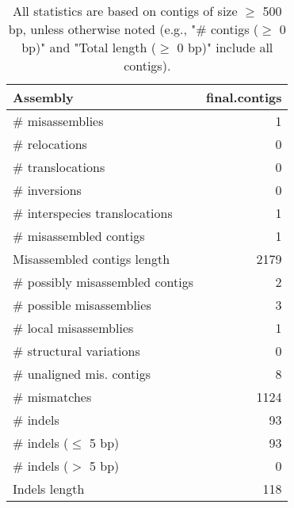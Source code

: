\documentclass[12pt,a4paper]{article}
\begin{document}
\begin{table}[ht]
\begin{center}
\caption{All statistics are based on contigs of size $\geq$ 500 bp, unless otherwise noted (e.g., "\# contigs ($\geq$ 0 bp)" and "Total length ($\geq$ 0 bp)" include all contigs).}
\begin{tabular}{|l*{1}{|r}|}
\hline
Assembly & final.contigs \\ \hline
\# misassemblies & 1 \\ \hline
\hspace{5mm}\# relocations & 0 \\ \hline
\hspace{5mm}\# translocations & 0 \\ \hline
\hspace{5mm}\# inversions & 0 \\ \hline
\hspace{5mm}\# interspecies translocations & 1 \\ \hline
\# misassembled contigs & 1 \\ \hline
Misassembled contigs length & 2179 \\ \hline
\# possibly misassembled contigs & 2 \\ \hline
\hspace{5mm}\# possible misassemblies & 3 \\ \hline
\# local misassemblies & 1 \\ \hline
\# structural variations & 0 \\ \hline
\# unaligned mis. contigs & 8 \\ \hline
\# mismatches & 1124 \\ \hline
\# indels & 93 \\ \hline
\hspace{5mm}\# indels ($\leq$ 5 bp) & 93 \\ \hline
\hspace{5mm}\# indels ($>$ 5 bp) & 0 \\ \hline
Indels length & 118 \\ \hline
\end{tabular}
\end{center}
\end{table}
\end{document}
